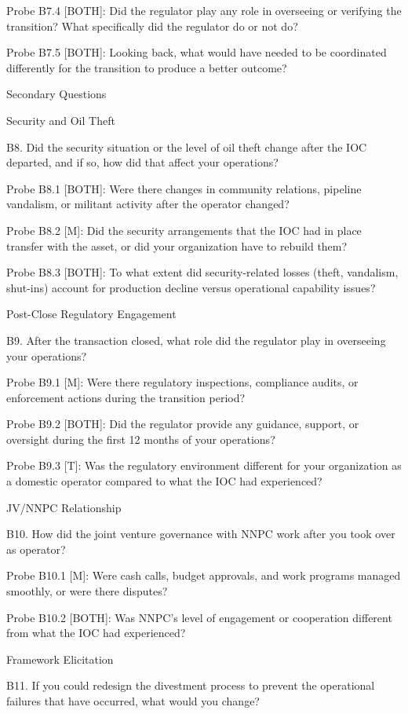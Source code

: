 \documentclass[twoside,fontset=lmodern]{mitthesis}
\begin{document}
Probe B7.4 {[}BOTH{]}: Did the regulator play any role in overseeing or
verifying the transition? What specifically did the regulator do or not
do?

Probe B7.5 {[}BOTH{]}: Looking back, what would have needed to be
coordinated differently for the transition to produce a better outcome?

Secondary Questions

Security and Oil Theft

B8. Did the security situation or the level of oil theft change after
the IOC departed, and if so, how did that affect your operations?

Probe B8.1 {[}BOTH{]}: Were there changes in community relations,
pipeline vandalism, or militant activity after the operator changed?

Probe B8.2 {[}M{]}: Did the security arrangements that the IOC had in
place transfer with the asset, or did your organization have to rebuild
them?

Probe B8.3 {[}BOTH{]}: To what extent did security-related losses
(theft, vandalism, shut-ins) account for production decline versus
operational capability issues?

Post-Close Regulatory Engagement

B9. After the transaction closed, what role did the regulator play in
overseeing your operations?

Probe B9.1 {[}M{]}: Were there regulatory inspections, compliance
audits, or enforcement actions during the transition period?

Probe B9.2 {[}BOTH{]}: Did the regulator provide any guidance, support,
or oversight during the first 12 months of your operations?

Probe B9.3 {[}T{]}: Was the regulatory environment different for your
organization as a domestic operator compared to what the IOC had
experienced?

JV/NNPC Relationship

B10. How did the joint venture governance with NNPC work after you took
over as operator?

Probe B10.1 {[}M{]}: Were cash calls, budget approvals, and work
programs managed smoothly, or were there disputes?

Probe B10.2 {[}BOTH{]}: Was NNPC's level of engagement or cooperation
different from what the IOC had experienced?

Framework Elicitation

B11. If you could redesign the divestment process to prevent the
operational failures that have occurred, what would you change?
\end{document}
